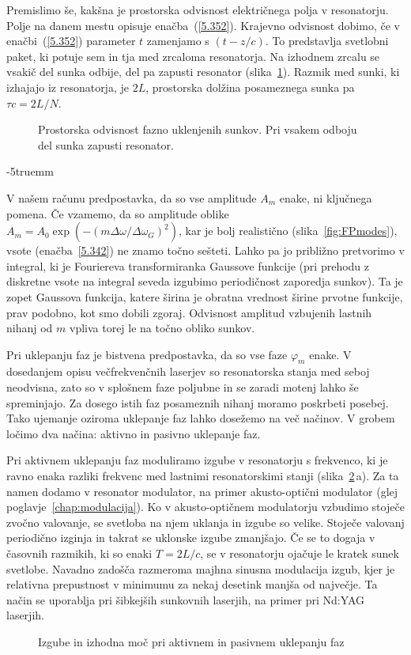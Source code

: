 Premislimo še, kakšna je prostorska odvisnost električnega polja v
resonatorju. Polje na danem mestu opisuje enačba~(\ref{5.352}). Krajevno 
odvisnost dobimo, če v enačbi~(\ref{5.352}) parameter $t$ zamenjamo s $(t-z/c)$. To
predstavlja svetlobni paket, ki potuje sem in tja med zrcaloma
resonatorja. Na izhodnem zrcalu se vsakič del sunka odbije, del pa zapusti
resonator (slika~\ref{fig.5.11}). Razmik med sunki, ki izhajajo iz
resonatorja, je $2L$, prostorska dolžina posameznega sunka pa $\tau c=2L/N$.
\begin{figure}[h]
\centering
\def\svgwidth{120truemm} 

\caption{Prostorska odvisnost fazno uklenjenih sunkov. Pri vsakem odboju del
sunka zapusti resonator.}
\label{fig.5.11}
\end{figure}
\vglue-5truemm
\begin{remark}
V našem računu predpostavka, da so vse amplitude $A_{m}$ enake, ni ključnega 
pomena. Če vzamemo, da so amplitude oblike 
$A_{m}=A_{0}\exp (-(m\Delta \omega /\Delta \omega_{G})^{2})$, 
kar je bolj realistično (slika~\ref{fig:FPmodes}), vsote (enačba~\ref{5.342}) 
ne znamo točno sešteti. Lahko pa jo
približno pretvorimo v integral, ki je Fouriereva transformiranka Gaussove
funkcije (pri prehodu z diskretne vsote na integral seveda izgubimo
periodičnost zaporedja sunkov). Ta je zopet Gaussova funkcija, katere
širina je obratna vrednost širine prvotne funkcije, prav podobno, kot
smo dobili zgoraj. Odvisnost amplitud vzbujenih lastnih nihanj od $m$ 
vpliva torej le na točno obliko sunkov.
\end{remark}
\newpage
Pri uklepanju faz je bistvena predpostavka, da so vse faze $\varphi_m$ enake. 
V dosedanjem opisu večfrekvenčnih laserjev so resonatorska stanja med seboj
neodvisna, zato so v splošnem faze poljubne in se zaradi motenj lahko še spreminjajo.
Za dosego istih faz posameznih nihanj moramo poskrbeti posebej. Tako ujemanje
oziroma uklepanje faz lahko dosežemo na več načinov. V grobem ločimo dva načina:
aktivno in pasivno uklepanje faz.

Pri aktivnem uklepanju faz moduliramo izgube v resonatorju
s frekvenco, ki je ravno enaka razliki 
frekvenc med lastnimi resonatorskimi stanji (slika~\ref{fig:aktpas}\,a). 
Za ta namen dodamo v resonator
modulator, na primer akusto-optični modulator (glej poglavje~\ref{chap:modulacija}).
Ko v akusto-optičnem modulatorju vzbudimo stoječe zvočno valovanje, se 
svetloba na njem uklanja in izgube so velike. Stoječe valovanj periodično izginja
in takrat se uklonske izgube zmanjšajo. Če se to dogaja v časovnih
razmikih, ki so enaki $T=2L/c$, se v resonatorju ojačuje le kratek sunek svetlobe. 
Navadno zadošča razmeroma majhna sinusna modulacija izgub, kjer je relativna 
prepustnost v minimumu za nekaj desetink manjša od največje. Ta način se uporablja
pri šibkejših sunkovnih laserjih, na primer pri Nd:YAG laserjih.
\begin{figure}[h]
\centering
\def\svgwidth{80truemm} 

\caption{Izgube in izhodna moč pri aktivnem in pasivnem uklepanju faz}
\label{fig:aktpas}
\end{figure}

